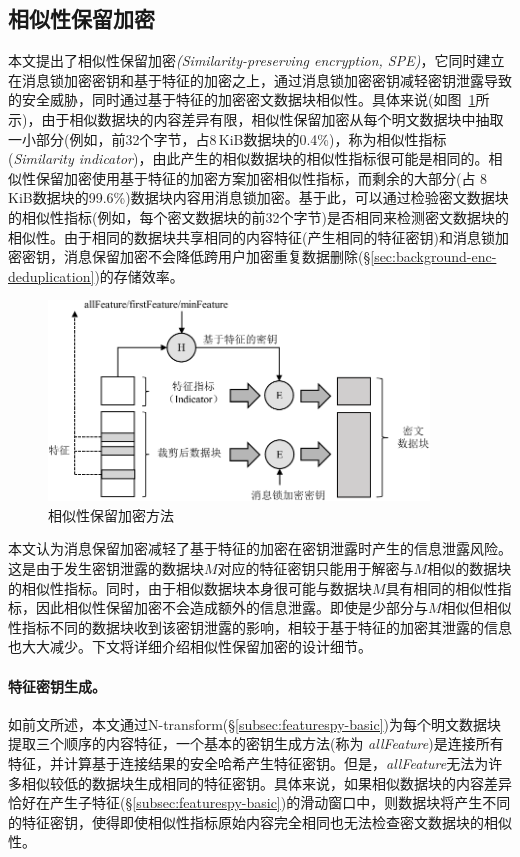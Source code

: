 
\subsection{相似性保留加密}
\label{subsec:featurespy-spe}

本文提出了相似性保留加密\textit{(Similarity-preserving
    encryption, SPE)}，它同时建立在消息锁加密密钥和基于特征的加密之上，通过消息锁加密密钥减轻密钥泄露导致的安全威胁，同时通过基于特征的加密密文数据块相似性。具体来说(如图~\ref{fig:featurespy-design-spe}所示)，由于相似数据块的内容差异有限，相似性保留加密从每个明文数据块中抽取一小部分(例如，前32个字节，占8\,KiB数据块的0.4\%)，称为相似性指标(\textit{Similarity indicator})，由此产生的相似数据块的相似性指标很可能是相同的。相似性保留加密使用基于特征的加密方案加密相似性指标，而剩余的大部分(占 8\,KiB数据块的99.6\%)数据块内容用消息锁加密。基于此，\sysnameF 可以通过检验密文数据块的相似性指标(例如，每个密文数据块的前32个字节)是否相同来检测密文数据块的相似性。由于相同的数据块共享相同的内容特征(产生相同的特征密钥)和消息锁加密密钥，消息保留加密不会降低跨用户加密重复数据删除(\S\ref{sec:background-enc-deduplication})的存储效率。

\begin{figure}[!htb]
    \centering
    \includegraphics[width=0.9\textwidth]{pic/featurespy/spe.pdf}
    \caption{相似性保留加密方法}
    \label{fig:featurespy-design-spe}
\end{figure}

本文认为消息保留加密减轻了基于特征的加密在密钥泄露时产生的信息泄露风险。这是由于发生密钥泄露的数据块$M$对应的特征密钥只能用于解密与$M$相似的数据块的相似性指标。同时，由于相似数据块本身很可能与数据块$M$具有相同的相似性指标，因此相似性保留加密不会造成额外的信息泄露。即使是少部分与$M$相似但相似性指标不同的数据块收到该密钥泄露的影响，相较于基于特征的加密其泄露的信息也大大减少。下文将详细介绍相似性保留加密的设计细节。

\paragraph*{特征密钥生成。}
如前文所述，本文通过N-transform(\S\ref{subsec:featurespy-basic})为每个明文数据块提取三个顺序的内容特征，一个基本的密钥生成方法(称为 \textit{allFeature})是连接所有特征，并计算基于连接结果的安全哈希产生特征密钥。但是，\textit{allFeature}无法为许多相似较低的数据块生成相同的特征密钥。具体来说，如果相似数据块的内容差异恰好在产生子特征(\S\ref{subsec:featurespy-basic})的滑动窗口中，则数据块将产生不同的特征密钥，使得即使相似性指标原始内容完全相同也无法检查密文数据块的相似性。

